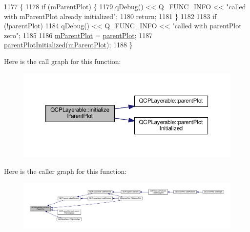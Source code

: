 \begin{DoxyCode}
1177                                                                \{
1178   \textcolor{keywordflow}{if} (\hyperlink{class_q_c_p_layerable_aa2a528433e44db02b8aef23c1f9f90ed}{mParentPlot}) \{
1179     qDebug() << Q\_FUNC\_INFO << \textcolor{stringliteral}{"called with mParentPlot already initialized"};
1180     \textcolor{keywordflow}{return};
1181   \}
1182 
1183   \textcolor{keywordflow}{if} (!parentPlot)
1184     qDebug() << Q\_FUNC\_INFO << \textcolor{stringliteral}{"called with parentPlot zero"};
1185 
1186   \hyperlink{class_q_c_p_layerable_aa2a528433e44db02b8aef23c1f9f90ed}{mParentPlot} = \hyperlink{class_q_c_p_layerable_ab7e0e94461566093d36ffc0f5312b109}{parentPlot};
1187   \hyperlink{class_q_c_p_layerable_ab20b7dbd8e0249ed61adb9622c427382}{parentPlotInitialized}(\hyperlink{class_q_c_p_layerable_aa2a528433e44db02b8aef23c1f9f90ed}{mParentPlot});
1188 \}
\end{DoxyCode}


Here is the call graph for this function\+:\nopagebreak
\begin{figure}[H]
\begin{center}
\leavevmode
\includegraphics[width=350pt]{class_q_c_p_layerable_a8cbe5a0c9a5674249982f5ca5f8e02bc_cgraph}
\end{center}
\end{figure}




Here is the caller graph for this function\+:\nopagebreak
\begin{figure}[H]
\begin{center}
\leavevmode
\includegraphics[width=350pt]{class_q_c_p_layerable_a8cbe5a0c9a5674249982f5ca5f8e02bc_icgraph}
\end{center}
\end{figure}


